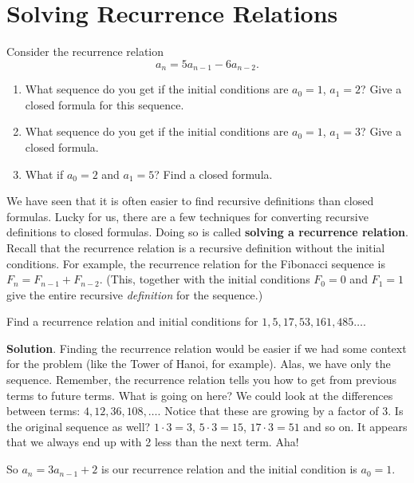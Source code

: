 \documentclass[11pt,]{book}
\newcommand{\terminology}[1]{\textbf{#1}}
\theoremstyle{ptxplainnotitle}
\theoremstyle{ptxplaintitle}
\theoremstyle{ptxdefinitionnotitle}
\theoremstyle{ptxdefinitiontitle}
\theoremstyle{ptxdefinitionnotitle}
\theoremstyle{ptxdefinitiontitle}
\theoremstyle{ptxdefinitionnotitle}
\theoremstyle{ptxdefinitiontitle}
\theoremstyle{ptxdefinitiontitlenonumber}
\theoremstyle{ptxdefinitiontitlenonumber}
\numberwithin{equation}{chapter}
\begin{document}
\section[{Solving Recurrence Relations}]{Solving Recurrence Relations}\label{sec_recurrence}
\begin{investigation}\label{investigation-7}
\hypertarget{p-415}{}%
Consider the recurrence relation%
\begin{equation*}
a_n = 5a_{n-1} - 6a_{n-2}.
\end{equation*}
%
\begin{enumerate}
\item\hypertarget{li-221}{}\hypertarget{p-416}{}%
What sequence do you get if the initial conditions are \(a_0 = 1\), \(a_1 = 2\)? Give a closed formula for this sequence.%
\item\hypertarget{li-222}{}\hypertarget{p-417}{}%
What sequence do you get if the initial conditions are \(a_0 = 1\), \(a_1 = 3\)? Give a closed formula.%
\item\hypertarget{li-223}{}\hypertarget{p-418}{}%
What if \(a_0 = 2\) and \(a_1 = 5\)? Find a closed formula.%
\end{enumerate}
%
\end{investigation}
\hypertarget{p-419}{}%
We have seen that it is often easier to find recursive definitions than closed formulas. Lucky for us, there are a few techniques for converting recursive definitions to closed formulas. Doing so is called \terminology{solving a recurrence relation}. Recall that the recurrence relation is a recursive definition without the initial conditions. For example, the recurrence relation for the Fibonacci sequence is \(F_n = F_{n-1} + F_{n-2}\). (This, together with the initial conditions \(F_0 = 0\) and \(F_1 = 1\) give the entire recursive \emph{definition} for the sequence.)%
\begin{example}\label{example-18}
\hypertarget{p-420}{}%
Find a recurrence relation and initial conditions for \(1, 5, 17, 53, 161, 485\ldots\).%
\par\smallskip%
\noindent\textbf{Solution}.\hypertarget{solution-57}{}\quad%
\hypertarget{p-421}{}%
Finding the recurrence relation would be easier if we had some context for the problem (like the Tower of Hanoi, for example). Alas, we have only the sequence. Remember, the recurrence relation tells you how to get from previous terms to future terms. What is going on here? We could look at the differences between terms: \(4, 12, 36, 108, \ldots\). Notice that these are growing by a factor of 3. Is the original sequence as well? \(1\cdot 3 = 3\), \(5 \cdot 3 = 15\), \(17 \cdot 3 = 51\) and so on. It appears that we always end up with 2 less than the next term. Aha!%
\par
\hypertarget{p-422}{}%
So \(a_n = 3a_{n-1} + 2\) is our recurrence relation and the initial condition is \(a_0 = 1\).%
\end{example}
\end{document}
